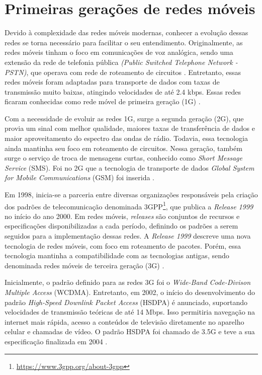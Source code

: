 \section{Primeiras gerações de redes móveis}

Devido à complexidade das redes móveis modernas, conhecer a evolução dessas redes se torna necessário para facilitar o seu entendimento. Originalmente, as redes móveis tinham o foco em comunicações de voz analógica, sendo uma extensão da rede de telefonia pública \textit{(Public Switched Telephone Network - PSTN)}, que operava com rede de roteamento de circuitos \cite{Cardoso2020}.
Entretanto, essas redes móveis foram adaptadas para transporte de dados com taxas de transmissão muito baixas, atingindo velocidades de até 2.4 kbps. Essas redes ficaram conhecidas como rede móvel de primeira geração (1G) \cite{vora2015evolution}.

Com a necessidade de evoluir as redes 1G, surge a segunda geração (2G), que provia um sinal com melhor qualidade, maiores taxas de transferência de dados e maior aproveitamento do espectro das ondas de rádio.
Todavia, essa tecnologia ainda mantinha seu foco em roteamento de circuitos.
Nessa geração, também surge o serviço de troca de mensagens curtas, conhecido como \textit{Short Message Service} (SMS).
Foi no 2G que a tecnologia de transporte de dados \textit{Global System for Mobile Communications} (GSM) foi inserida \cite{bhalla2010generations}.

Em 1998, inicia-se a parceria entre diversas organizações responsáveis pela criação dos padrões de telecomunicação denominada 3GPP\footnote{\url{https://www.3gpp.org/about-3gpp}}, que publica a \textit{Release 1999} no início do ano 2000.
Em redes móveis, \textit{releases} são conjuntos de recursos e especificações disponibilizadas a cada período, definindo os padrões a serem seguidos para a implementação dessas redes.
A \textit{Release 1999} descreve uma nova tecnologia de redes móveis, com foco em roteamento de pacotes.
Porém, essa tecnologia mantinha a compatibilidade com as tecnologias antigas, sendo denominada redes móveis de terceira geração (3G) \cite{3gpp.01.01}.

Inicialmente, o padrão definido para as redes 3G foi o \textit{Wide-Band Code-Divison Multiple Access} (WCDMA).
Entretanto, em 2002, o início do desenvolvimento do padrão \textit{High-Speed Downlink Packet Access} (HSDPA) é anunciado, suportando velocidades de transmissão teóricas de até 14 Mbps. Isso permitiria navegação na internet mais rápida, acesso a conteúdos de televisão diretamente no aparelho celular e chamadas de vídeo. O padrão HSDPA foi chamado de 3.5G e teve a sua especificação finalizada em 2004 \cite{Lamba2012}.

